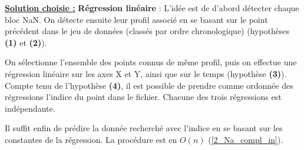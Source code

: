 \documentclass[12pt]{article}
\begin{document}
    \textbf{\underline{Solution choisie :}} \textbf{Régression linéaire} : L'idée est de d'abord détecter chaque bloc NaN. On détecte ensuite leur profil associé en se basant sur le point précédent dans le jeu de données (classés par ordre chronologique) (hypothèses \textbf{(1)} et \textbf{(2)}).
    
    On sélectionne l'ensemble des points connus de même profil, puis on effectue une régression linéaire sur les axes X et Y, ainsi que sur le temps (hypothèse \textbf{(3)}). Compte tenu de l'hypothèse \textbf{(4)}, il est possible de prendre comme ordonnée des régressions l'indice du point dans le fichier. Chacune des trois régressions est indépendante.
    
    \label{2_Na_compl_out}Il suffit enfin de prédire la donnée recherché avec l'indice en se basant sur les constantes de la régression. La procédure est en $O(n)$ (\ref{2_Na_compl_in}).\\
\end{document}
